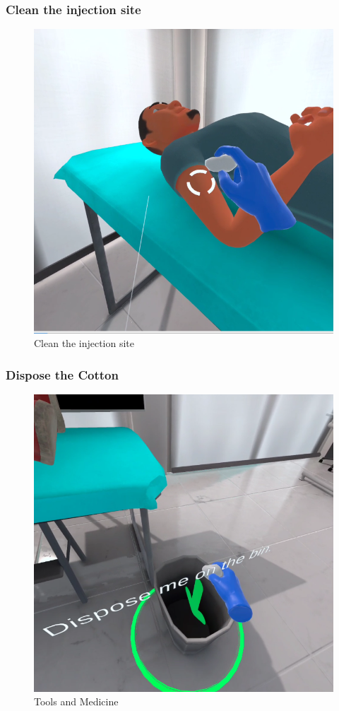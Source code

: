 \subsubsection{Clean the injection site}
\begin{figure}[h]
	\centering
	\includegraphics[width=0.65\linewidth]{Images/Clean the injection site.png}
	\caption{Clean the injection site}
	\label{fig:Clean the injection site}
\end{figure}

\subsubsection{Dispose the Cotton}
\begin{figure}[h]
	\centering
	\includegraphics[width=0.65\linewidth]{Images/Dispose the Cotton.png}
	\caption{Tools and Medicine}
	\label{fig:system-diagram}
\end{figure}



